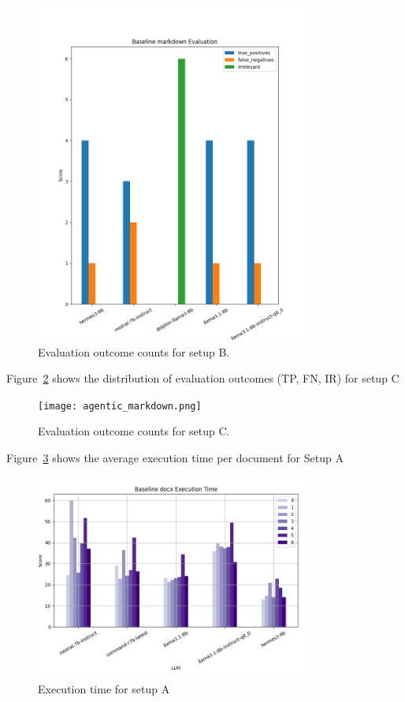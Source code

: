 \begin{figure}[H]
  \centering
  \includegraphics[width=0.8\textwidth]{baseline_markdown.png}
  \caption{Evaluation outcome counts for setup B.}
  \label{fig:baseline_markdown}
\end{figure}

Figure~\ref{fig:agentic_markdown} shows the distribution of evaluation outcomes
(TP, FN, IR) for setup C

\begin{figure}[H]
  \centering
  \texttt{[image: agentic\_markdown.png]}
  \caption{Evaluation outcome counts for setup C.}
  \label{fig:agentic_markdown}
\end{figure}

Figure~\ref{fig:baseline_docxexecution_time} shows the average execution time
per document for Setup A

\begin{figure}[H]
  \centering
  \includegraphics[width=0.8\textwidth]{baseline_docxexecution_time.png}
    \caption{Execution time for setup A}
  \label{fig:baseline_docxexecution_time}
\end{figure}

